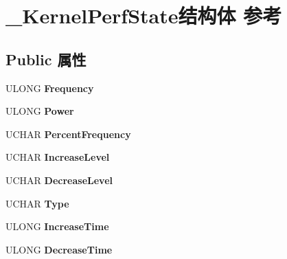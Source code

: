 \hypertarget{struct___kernel_perf_state}{}\section{\+\_\+\+Kernel\+Perf\+State结构体 参考}
\label{struct___kernel_perf_state}
\subsection*{Public 属性}
\begin{DoxyCompactItemize}
\item 
\mbox{\label{struct___kernel_perf_state_a532f5418cdd4b145972bd0809fd202b8}} 
U\+L\+O\+NG {\bfseries Frequency}
\item 
\mbox{\label{struct___kernel_perf_state_aa407dd82a86d8516eb3abe3c67f7c94b}} 
U\+L\+O\+NG {\bfseries Power}
\item 
\mbox{\label{struct___kernel_perf_state_ae7e0358fb14bad0019288636e1b60512}} 
U\+C\+H\+AR {\bfseries Percent\+Frequency}
\item 
\mbox{\label{struct___kernel_perf_state_aa65d3515e6d30bf3953897f179c11b80}} 
U\+C\+H\+AR {\bfseries Increase\+Level}
\item 
\mbox{\label{struct___kernel_perf_state_a16585ac57718530387f7f7f1f26a0c41}} 
U\+C\+H\+AR {\bfseries Decrease\+Level}
\item 
\mbox{\label{struct___kernel_perf_state_a8ab9e533eeb84f1247c6caff664c83fb}} 
U\+C\+H\+AR {\bfseries Type}
\item 
\mbox{\label{struct___kernel_perf_state_a2130f9a131cfae2de3a63dd10bb63c9c}} 
U\+L\+O\+NG {\bfseries Increase\+Time}
\item 
\mbox{\label{struct___kernel_perf_state_a3f1a3d381971af4c709e1782475e970c}} 
U\+L\+O\+NG {\bfseries Decrease\+Time}
\item 
\mbox{\label{struct___kernel_perf_state_a3bb84a09872f1b85e58f298f06289d77}} 

\end{DoxyCompactItemize}
